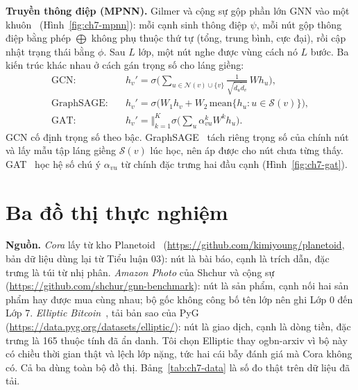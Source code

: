 \textbf{Truyền thông điệp (MPNN).} Gilmer và cộng sự gộp phần lớn GNN vào một khuôn~\cite{ch7:gilmer2017}
(Hình~\ref{fig:ch7-mpnn}): mỗi cạnh sinh thông điệp $\psi$, mỗi nút gộp thông điệp bằng phép $\bigoplus$ không phụ thuộc thứ tự
(tổng, trung bình, cực đại), rồi cập nhật trạng thái bằng $\phi$. Sau $L$ lớp, một nút nghe được vùng cách nó $L$ bước.
Ba kiến trúc khác nhau ở cách gán trọng số cho láng giềng:
\begin{align}
\text{GCN:}\quad & h_v'=\sigma\Big(\sum_{u\in\mathcal N(v)\cup\{v\}}\frac{1}{\sqrt{\tilde d_u\tilde d_v}}\,Wh_u\Big),\\
\text{GraphSAGE:}\quad & h_v'=\sigma\big(W_1h_v+W_2\,\mathrm{mean}\{h_u: u\in\mathcal S(v)\}\big),\\
\text{GAT:}\quad & h_v'=\big\Vert_{k=1}^{K}\sigma\Big(\sum_{u}\alpha^{k}_{vu}W^{k}h_u\Big).
\end{align}
GCN cố định trọng số theo bậc. GraphSAGE~\cite{ch7:hamilton2017} tách riêng trọng số của chính nút và lấy mẫu tập láng giềng
$\mathcal S(v)$ lúc học, nên áp được cho nút chưa từng thấy. GAT~\cite{ch7:velickovic2018} học hệ số chú ý $\alpha_{vu}$ từ
chính đặc trưng hai đầu cạnh (Hình~\ref{fig:ch7-gat}).




\section{Ba đồ thị thực nghiệm}

\textbf{Nguồn.} \emph{Cora} lấy từ kho Planetoid~\cite{ch7:yang2016}
(\url{https://github.com/kimiyoung/planetoid}, bản dữ liệu dùng lại từ Tiểu luận 03): nút là bài báo, cạnh là trích dẫn,
đặc trưng là túi từ nhị phân. \emph{Amazon Photo} của Shchur và cộng sự~\cite{ch7:shchur2018}
(\url{https://github.com/shchur/gnn-benchmark}): nút là sản phẩm, cạnh nối hai sản phẩm hay được mua cùng nhau; bộ gốc không
công bố tên lớp nên ghi Lớp 0 đến Lớp 7. \emph{Elliptic Bitcoin}~\cite{ch7:weber2019}, tải bản sao của PyG
(\url{https://data.pyg.org/datasets/elliptic/}): nút là giao dịch, cạnh là dòng tiền, đặc trưng là 165 thuộc tính đã ẩn danh.
Tôi chọn Elliptic thay ogbn-arxiv vì bộ này có chiều thời gian thật và lệch lớp nặng, tức hai cái bẫy đánh giá mà Cora
không có. Cả ba dùng toàn bộ đồ thị. Bảng~\ref{tab:ch7-data} là số đo thật trên dữ liệu đã tải.


